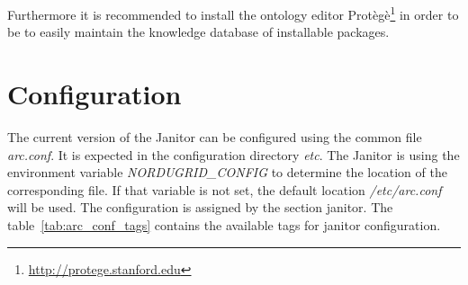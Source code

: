 Furthermore it is recommended to install the ontology editor 
Prot\`eg\`e\footnote{\href{http://protege.stanford.edu}{http://protege.stanford.edu}} in order to be to easily maintain the 
knowledge database of installable packages.





\section{Configuration}\label{sec:janitor_configuration}

The current version of the Janitor can be configured using the common file \textit{arc.conf}. It is expected in the 
configuration directory \textit{etc}. The Janitor is using the environment variable \textit{NORDUGRID\_CONFIG}
to determine the location of the corresponding file. If that variable is not set, the default location \textit{/etc/arc.conf} will be used. 
The configuration is assigned by the section \lbrack janitor\rbrack. The table~\ref{tab:arc_conf_tags} contains the available tags
for janitor configuration.

